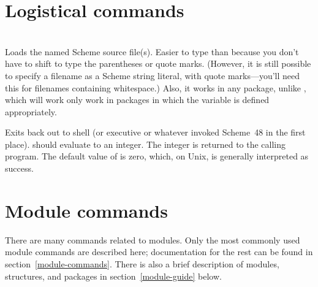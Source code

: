 \section{Logistical commands}
\begin{description}
\item {}\\
    Loads the named Scheme source file(s).
    Easier to type than  because you don't have to
    shift to type the parentheses or quote marks.  
    (However, it is still possible to specify a filename as a Scheme
    string literal, with quote marks---you'll need this for filenames
    containing whitespace.)
    Also, it works in
    any package, unlike , which will work only
    work in packages in which the variable  is defined appropriately.

\item {}
    Exits back out to shell (or executive or whatever invoked Scheme~48
    in the first place).
     should evaluate to an integer.  The
    integer is returned to the calling program.
    The default value of  is zero, which, on Unix,
    is generally interpreted as success.
\end{description}

\section{Module commands}
\label{module-command-guide}

There are many commands related to modules.
Only the most commonly used module commands are described here;
 documentation for the
 rest can be found in section~\ref{module-commands}.
There is also
a brief description of modules, structures, and packages in section~\ref{module-guide} below.

